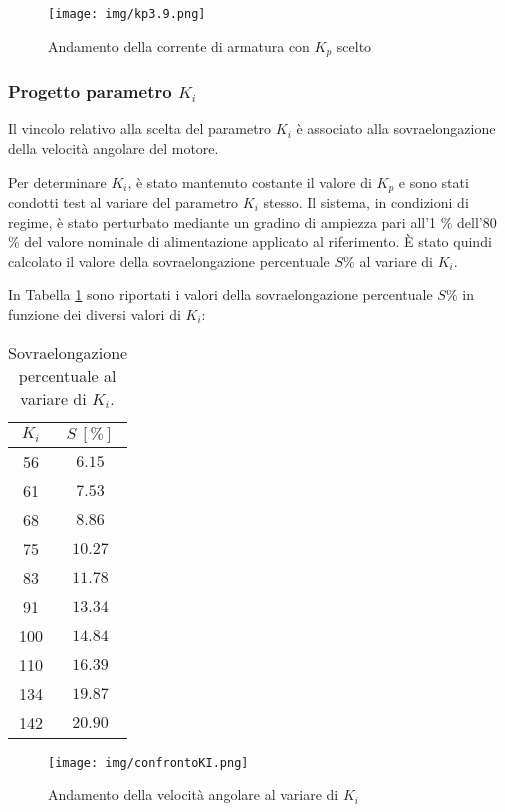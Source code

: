 \documentclass{article}
\begin{document}
\begin{figure}[h!]
\centering
\texttt{[image: img/kp3.9.png]}
\caption{Andamento della corrente di armatura con $K_p$ scelto}
\label{fig:kpscelto}
\end{figure}

\subsubsection{Progetto parametro $K_i$}

Il vincolo relativo alla scelta del parametro $K_i$ è associato alla sovraelongazione della velocità angolare del motore.

Per determinare $K_i$, è stato mantenuto costante il valore di $K_p$ e sono stati condotti test al variare del parametro $K_i$ stesso. Il sistema, in condizioni di regime, è stato perturbato mediante un gradino di ampiezza pari all'1 $\%$ dell'80 $\%$ del valore nominale di alimentazione applicato al riferimento. È stato quindi calcolato il valore della sovraelongazione percentuale $S\%$ al variare di $K_i$.

In Tabella \ref{tab:4} sono riportati i valori della sovraelongazione percentuale $S\%$ in funzione dei diversi valori di $K_i$:

\begin{table}[h!]
\centering
\begin{tabular}{ |c|c| } 
  \hline
  $K_i$ & $S~[\%]$ \\ 
  \hline
  56 & $6.15$  \\ 
  \hline
  61 & $7.53$ \\
  \hline
  68 & $8.86$  \\ 
  \hline
  75 & $10.27$ \\
  \hline
  83 & $11.78$  \\ 
  \hline
  91 & $13.34$ \\
  \hline
  100 & $14.84$ \\
  \hline
  110 & $16.39$ \\
  \hline
  134 & $19.87$ \\
  \hline
  142 & $20.90$ \\
  \hline
\end{tabular}
\caption{\label{tab:4}Sovraelongazione percentuale al variare di $K_i$.}
\end{table}

\begin{figure}[h!]
\texttt{[image: img/confrontoKI.png]}
\caption{Andamento della velocità angolare al variare di $K_i$}
\label{fig:simki}
\end{figure}
\newpage
\end{document}
